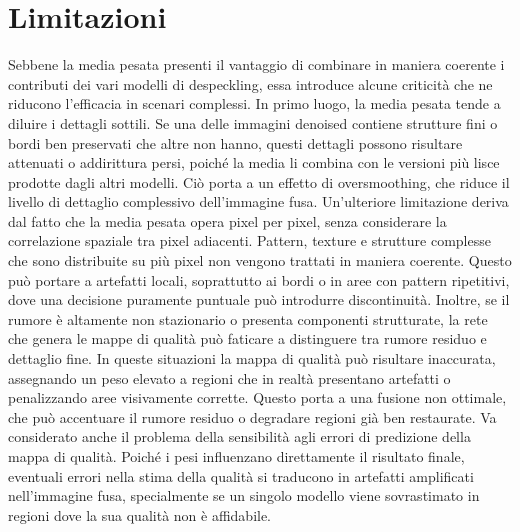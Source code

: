\section{Limitazioni}
Sebbene la media pesata presenti il vantaggio di combinare in maniera coerente i contributi dei vari modelli di despeckling, 
essa introduce alcune criticità che ne riducono l’efficacia in scenari complessi.
In primo luogo, la media pesata tende a diluire i dettagli sottili. Se una delle immagini denoised contiene strutture fini 
o bordi ben preservati che altre non hanno, questi dettagli possono risultare attenuati o addirittura persi, poiché la 
media li combina con le versioni più lisce prodotte dagli altri modelli. Ciò porta a un effetto di oversmoothing, che riduce 
il livello di dettaglio complessivo dell’immagine fusa.
Un’ulteriore limitazione deriva dal fatto che la media pesata opera pixel per pixel, senza considerare la correlazione spaziale 
tra pixel adiacenti. Pattern, texture e strutture complesse che sono distribuite su più pixel non vengono trattati in maniera 
coerente. Questo può portare a artefatti locali, soprattutto ai bordi o in aree con pattern ripetitivi, dove una decisione 
puramente puntuale può introdurre discontinuità.
Inoltre, se il rumore è altamente non stazionario o presenta componenti strutturate, la rete che genera le mappe di qualità 
può faticare a distinguere tra rumore residuo e dettaglio fine. In queste situazioni la mappa di qualità può risultare 
inaccurata, assegnando un peso elevato a regioni che in realtà presentano artefatti o penalizzando aree visivamente corrette. 
Questo porta a una fusione non ottimale, che può accentuare il rumore residuo o degradare regioni già ben restaurate.
Va considerato anche il problema della sensibilità agli errori di predizione della mappa di qualità. Poiché i pesi influenzano 
direttamente il risultato finale, eventuali errori nella stima della qualità si traducono in artefatti amplificati nell’immagine 
fusa, specialmente se un singolo modello viene sovrastimato in regioni dove la sua qualità non è affidabile.


